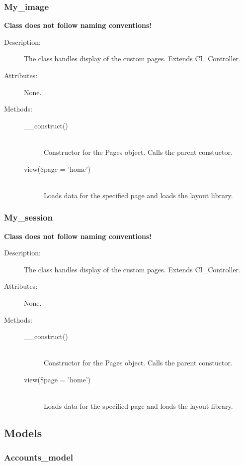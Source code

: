 \documentclass[11pt]{article} %
\begin{document}
\subsubsection{My\_image}
\textbf{Class does not follow naming conventions!}\\
\begin{description}
\item[Description:] The class handles display of the custom pages. Extends CI\_Controller.
\item[Attributes:] None.
\item[Methods:] \textbf{ }
\begin{description}
\item[\_\_construct()]  \textbf{ }\\
Constructor for the Pages object. Calls the parent constuctor.
\item[view(\$page = 'home')]  \textbf{ }\\
Loads data for the specified page and loads the layout library.
\end{description} 
\end{description} 

\subsubsection{My\_session}
\textbf{Class does not follow naming conventions!}\\
\begin{description}
\item[Description:] The class handles display of the custom pages. Extends CI\_Controller.
\item[Attributes:] None.
\item[Methods:] \textbf{ }
\begin{description}
\item[\_\_construct()]  \textbf{ }\\
Constructor for the Pages object. Calls the parent constuctor.
\item[view(\$page = 'home')]  \textbf{ }\\
Loads data for the specified page and loads the layout library.
\end{description} 
\end{description} 


\subsection{Models}
\subsubsection{Accounts\_model}
\end{document}
